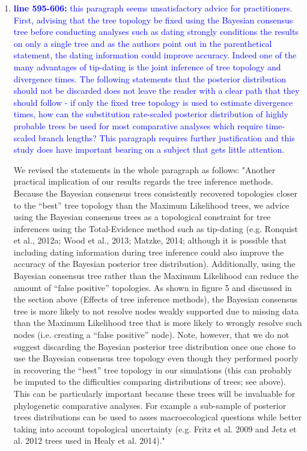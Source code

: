 \documentclass[12pt,letterpaper]{article}
\begin{document}
\begin{enumerate}
\item{\textcolor{blue}{\textbf{line 595-606:} this paragraph seems unsatisfactory advice for practitioners.
First, advising that the tree topology be fixed using the Bayesian consensus tree before conducting analyses such as dating strongly conditions the results on only a single tree and as the authors point out in the parenthetical statement, the dating information could improve accuracy. Indeed one of the many advantages of tip-dating is the joint inference of tree topology and divergence times.
The following statements that the posterior distribution should not be discarded does not leave the reader with a clear path that they should follow - if only the fixed tree topology is used to estimate divergence times, how can the substitution rate-scaled posterior distribution of highly probable trees be used for most comparative analyses which require time-scaled branch lengths?
This paragraph requires further justification and this study does have important bearing on a subject that gets little attention. }}

We revised the statements in the whole paragraph as follows:
"Another practical implication of our results regards the tree inference methods.
Because the Bayesian consensus trees consistently recovered topologies closer to the ``best'' tree topology than the Maximum Likelihood trees, we advice using the Bayesian consensus trees as a topological constraint for tree inferences using the Total-Evidence method such as tip-dating (e.g. Ronquist et al., 2012a; Wood et al., 2013; Matzke, 2014; although it is possible that including dating information during tree inference could also improve the accuracy of the Bayesian posterior tree distribution).
Additionally, using the Bayesian consensus tree rather than the Maximum Likelihood can reduce the amount of ``false positive'' topologies.
As shown in figure 5 and discussed in the section above (Effects of tree inference methods), the Bayesian consensus tree is more likely to not resolve nodes weakly supported due to missing data than the Maximum Likelihood tree that is more likely to wrongly resolve such nodes (i.e. creating a ``false positive'' node).
Note, however, that we do not suggest discarding the Bayesian posterior tree distribution once one chose to use the Bayesian consensus tree topology even though they performed poorly in recovering the ``best'' tree topology in our simulations (this can probably be imputed to the difficulties comparing distributions of trees; see above).
This can be particularly important because these trees will be invaluable for phylogenetic comparative analyses. For example a sub-sample of posterior trees distributions can be used to asses macroecological questions while better taking into account topological uncertainty (e.g. Fritz et al. 2009 and Jetz et al. 2012 trees used in Healy et al. 2014)."


\end{enumerate}
\end{document}
